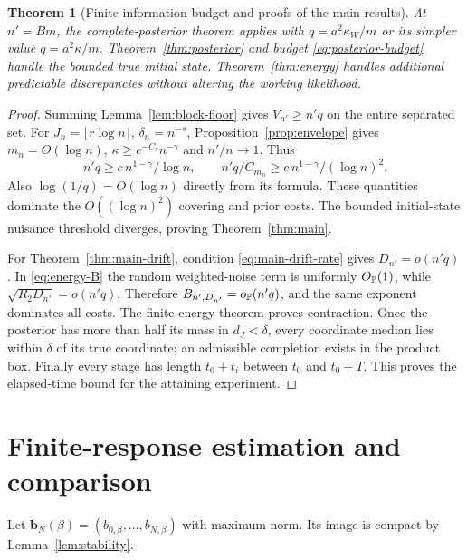 \documentclass[11pt,reqno]{amsart}
\newtheorem{theorem}{Theorem}[section]
\theoremstyle{remark}\newtheorem{remark}[theorem]{Remark}
\begin{document}
\begin{theorem}[Finite information budget and proofs of the main results]
\label{thm:block-posterior}
At $n'=Bm$, the complete-posterior theorem applies with
$q=a^2\kappa_W/m$ or its simpler value $q=a^2\kappa/m$.
Theorem~\ref{thm:posterior} and budget \eqref{eq:posterior-budget} handle the
bounded true initial state. Theorem~\ref{thm:energy} handles additional
predictable discrepancies without altering the working likelihood.
\end{theorem}
\begin{proof}
Summing Lemma~\ref{lem:block-floor} gives $V_{n'}\ge n'q$ on the entire
separated set. For $J_n=\lfloor r\log n\rfloor$, $\delta_n=n^{-s}$,
Proposition~\ref{prop:envelope} gives $m_n=O(\log n)$,
$\kappa\ge e^{-C_\tau}n^{-\gamma}$ and $n'/n\to1$. Thus
\[
 n'q\ge c\,n^{1-\gamma}/\log n,\qquad
 n'q/C_{m_n}\ge c\,n^{1-\gamma}/(\log n)^2.
\]
Also $\log(1/q)=O(\log n)$ directly from its formula. These quantities
dominate the $O((\log n)^2)$ covering and prior costs. The bounded
initial-state nuisance threshold diverges, proving Theorem~\ref{thm:main}.

For Theorem~\ref{thm:main-drift}, condition \eqref{eq:main-drift-rate} gives
$D_{n'}=o(n'q)$. In \eqref{eq:energy-B} the random weighted-noise term is
uniformly $O_{\mathbb P}(1)$, while $\sqrt{R_2D_{n'}}=o(n'q)$.
Therefore $B_{n',D_{n'}}=o_{\mathbb P}(n'q)$, and the same exponent dominates all
costs. The finite-energy theorem proves contraction. Once the posterior has
more than half its mass in $d_J<\delta$, every coordinate median lies within
$\delta$ of its true coordinate; an admissible completion exists in the
product box. Finally every stage has length $t_0+t_i$ between $t_0$ and
$t_0+T$. This proves the elapsed-time bound for the attaining experiment.
\end{proof}

\section{Finite-response estimation and comparison}
\label{sec:transfer}
Let $\mathbf b_N(\beta)=(b_{0,\beta},\ldots,b_{N,\beta})$ with maximum
norm. Its image is compact by Lemma~\ref{lem:stability}.
\end{document}
